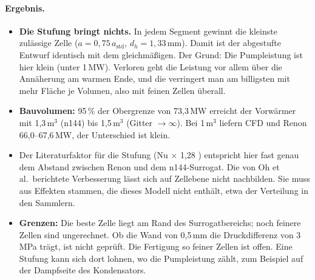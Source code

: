 \paragraph{Ergebnis.}
\begin{itemize}
\item \textbf{Die Stufung bringt nichts.} In jedem Segment gewinnt die kleinste zulässige Zelle ($a = 0{,}75\,a_\mathrm{std}$,
  $d_h = 1{,}33$\,mm). Damit ist der abgestufte Entwurf identisch mit dem gleichmäßigen. Der Grund: Die Pumpleistung
  ist hier klein (unter 1\,MW). Verloren geht die Leistung vor allem über die Annäherung am warmen Ende, und die
  verringert man am billigsten mit mehr Fläche je Volumen, also mit feinen Zellen überall.
\item \textbf{Bauvolumen:} 95\,\% der Obergrenze von 73,3\,MW erreicht der Vorwärmer mit 1,3\,m$^3$ (n144) bis
  1,5\,m$^3$ (Gitter $\to\infty$). Bei 1\,m$^3$ liefern CFD und Renon 66,0--67,6\,MW, der Unterschied ist klein.
\item Der Literaturfaktor für die Stufung (Nu $\times$ 1,28 \cite{oh2025}) entspricht hier fast genau dem Abstand
  zwischen Renon und dem n144-Surrogat. Die von Oh et al.\ berichtete Verbesserung lässt sich auf Zellebene nicht
  nachbilden. Sie muss aus Effekten stammen, die dieses Modell nicht enthält, etwa der Verteilung in den Sammlern.
\item \textbf{Grenzen:} Die beste Zelle liegt am Rand des Surrogatbereichs; noch feinere Zellen sind ungerechnet. Ob
  die Wand von 0,5\,mm die Druckdifferenz von 3\,MPa trägt, ist nicht geprüft. Die Fertigung so feiner Zellen ist offen.
  Eine Stufung kann sich dort lohnen, wo die Pumpleistung zählt, zum Beispiel auf der Dampfseite des Kondensators.
\end{itemize}
